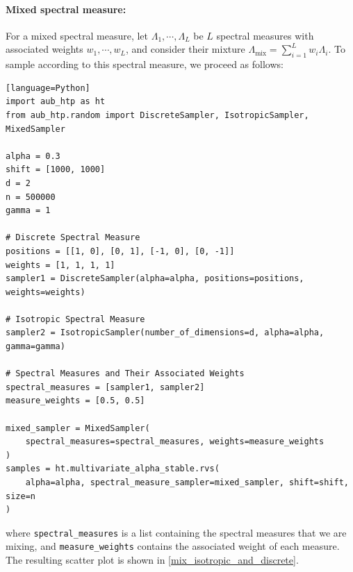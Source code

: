\paragraph{Mixed spectral measure:} For a mixed spectral measure, let $\Lambda_1, \cdots, \Lambda_L$ be $L$ spectral measures with associated weights $w_1, \cdots, w_L$, and consider their mixture $\Lambda_{\text{mix}} = \sum_{i=1}^L w_i \Lambda_i$. To sample according to this spectral measure, we proceed as follows:

\begin{verbatim}[language=Python]
import aub_htp as ht
from aub_htp.random import DiscreteSampler, IsotropicSampler, MixedSampler

alpha = 0.3
shift = [1000, 1000]
d = 2
n = 500000
gamma = 1

# Discrete Spectral Measure
positions = [[1, 0], [0, 1], [-1, 0], [0, -1]]
weights = [1, 1, 1, 1]
sampler1 = DiscreteSampler(alpha=alpha, positions=positions, weights=weights)

# Isotropic Spectral Measure
sampler2 = IsotropicSampler(number_of_dimensions=d, alpha=alpha, gamma=gamma)

# Spectral Measures and Their Associated Weights
spectral_measures = [sampler1, sampler2]
measure_weights = [0.5, 0.5]

mixed_sampler = MixedSampler(
    spectral_measures=spectral_measures, weights=measure_weights
)
samples = ht.multivariate_alpha_stable.rvs(
    alpha=alpha, spectral_measure_sampler=mixed_sampler, shift=shift, size=n
)

\end{verbatim}
where \texttt{spectral\_measures} is a list containing the spectral measures that we are mixing, and \texttt{measure\_weights} contains the associated weight of each measure. The resulting scatter plot is shown in \cref{mix_isotropic_and_discrete}.

